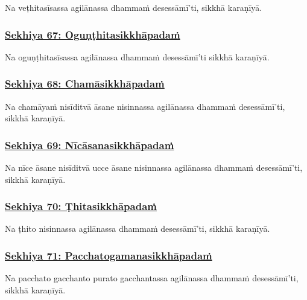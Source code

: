 Na veṭhitasīsassa agilānassa dhammaṁ desessāmī'ti, sikkhā karaṇīyā.



\subsubsection*{\hyperref[training67]{Sekhiya 67: Oguṇṭhitasikkhāpadaṁ}}
\label{sekh67}

Na oguṇṭhitasīsassa agilānassa dhammaṁ desessāmī'ti sikkhā karaṇīyā.



\subsubsection*{\hyperref[training68]{Sekhiya 68: Chamāsikkhāpadaṁ}}
\label{sekh68}

Na chamāyaṁ nisīditvā āsane nisinnassa agilānassa dhammaṁ desessāmī'ti, sikkhā karaṇīyā.



\subsubsection*{\hyperref[training69]{Sekhiya 69: Nīcāsanasikkhāpadaṁ}}
\label{sekh69}

Na nīce āsane nisīditvā ucce āsane nisinnassa agilānassa dhammaṁ desessāmī'ti, sikkhā karaṇīyā.



\subsubsection*{\hyperref[training70]{Sekhiya 70: Ṭhitasikkhāpadaṁ}}
\label{sekh70}

Na ṭhito nisinnassa agilānassa dhammaṁ desessāmī'ti, sikkhā karaṇīyā.



\subsubsection*{\hyperref[training71]{Sekhiya 71: Pacchatogamanasikkhāpadaṁ}}
\label{sekh71}

Na pacchato gacchanto purato gacchantassa agilānassa dhammaṁ desessāmī'ti, sikkhā karaṇīyā.



